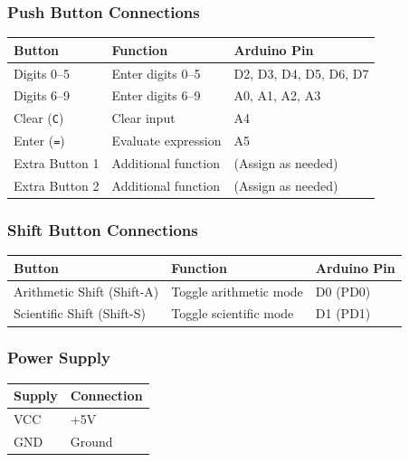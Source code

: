 \documentclass{article}
\theoremstyle{remark}
\begin{document}
\subsubsection{Push Button Connections}
\begin{center}
\begin{tabular}{|l|l|l|}
\hline
\textbf{Button}  & \textbf{Function}         & \textbf{Arduino Pin} \\ \hline
Digits 0--5    & Enter digits 0--5         & D2, D3, D4, D5, D6, D7 \\ \hline
Digits 6--9    & Enter digits 6--9         & A0, A1, A2, A3 \\ \hline
Clear (\texttt{C})    & Clear input                & A4 \\ \hline
Enter (\texttt{=})   & Evaluate expression        & A5 \\ \hline
Extra Button 1 & Additional function       & (Assign as needed) \\ \hline
Extra Button 2 & Additional function       & (Assign as needed) \\ \hline
\end{tabular}
\end{center}

\subsubsection{Shift Button Connections}
\begin{center}
\begin{tabular}{|l|l|l|}
\hline
\textbf{Button}               & \textbf{Function}          & \textbf{Arduino Pin} \\ \hline
Arithmetic Shift (Shift-A)    & Toggle arithmetic mode   & D0 (PD0) \\ \hline
Scientific Shift (Shift-S)    & Toggle scientific mode     & D1 (PD1) \\ \hline
\end{tabular}
\end{center}

\subsubsection{Power Supply}
\begin{center}
\begin{tabular}{|l|l|}
\hline
\textbf{Supply} & \textbf{Connection} \\ \hline
VCC           & +5V \\ \hline
GND           & Ground \\ \hline
\end{tabular}
\end{center}
\end{document}
